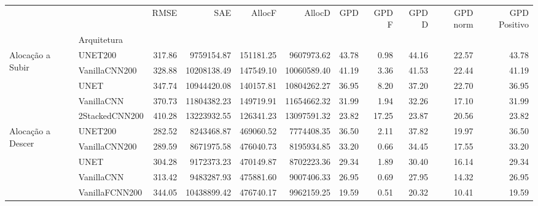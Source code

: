\begin{tabular}{llrrrrrrrrr}
\toprule
 &  & RMSE & SAE & AllocF & AllocD & GPD & GPD F & GPD D & GPD norm & GPD Positivo \\
 & Arquitetura &  &  &  &  &  &  &  &  &  \\
\midrule
\multirow[t]{5}{*}{Alocação a Subir} & UNET200 & 317.86 & 9759154.87 & 151181.25 & 9607973.62 & 43.78 & 0.98 & 44.16 & 22.57 & 43.78 \\
 & VanillaCNN200 & 328.88 & 10208138.49 & 147549.10 & 10060589.40 & 41.19 & 3.36 & 41.53 & 22.44 & 41.19 \\
 & UNET & 347.74 & 10944420.08 & 140157.81 & 10804262.27 & 36.95 & 8.20 & 37.20 & 22.70 & 36.95 \\
 & VanillaCNN & 370.73 & 11804382.23 & 149719.91 & 11654662.32 & 31.99 & 1.94 & 32.26 & 17.10 & 31.99 \\
 & 2StackedCNN200 & 410.28 & 13223932.55 & 126341.23 & 13097591.32 & 23.82 & 17.25 & 23.87 & 20.56 & 23.82 \\
\cline{1-11}
\multirow[t]{5}{*}{Alocação a Descer} & UNET200 & 282.52 & 8243468.87 & 469060.52 & 7774408.35 & 36.50 & 2.11 & 37.82 & 19.97 & 36.50 \\
 & VanillaCNN200 & 289.59 & 8671975.58 & 476040.73 & 8195934.85 & 33.20 & 0.66 & 34.45 & 17.55 & 33.20 \\
 & UNET & 304.28 & 9172373.23 & 470149.87 & 8702223.36 & 29.34 & 1.89 & 30.40 & 16.14 & 29.34 \\
 & VanillaCNN & 313.42 & 9483287.93 & 475881.60 & 9007406.33 & 26.95 & 0.69 & 27.95 & 14.32 & 26.95 \\
 & VanillaFCNN200 & 344.05 & 10438899.42 & 476740.17 & 9962159.25 & 19.59 & 0.51 & 20.32 & 10.41 & 19.59 \\
\cline{1-11}
\bottomrule
\end{tabular}
